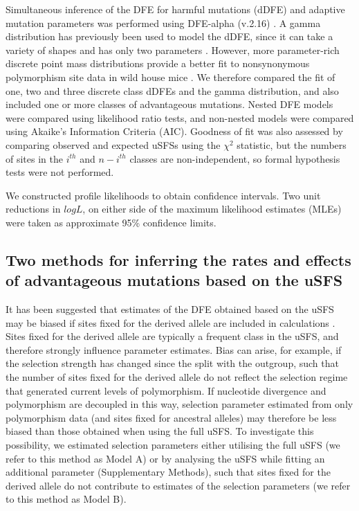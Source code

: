 	Simultaneous inference of the DFE for harmful mutations (dDFE) and adaptive mutation parameters was performed using DFE-alpha (v.2.16) \citep{RN210}. A gamma distribution has previously been used to model the dDFE, since it can take a variety of shapes and has only two parameters \citep{RN109}. However, more parameter-rich discrete point mass distributions provide a better fit to nonsynonymous polymorphism site data in wild house mice \citep{RN178}. We therefore compared the fit of one, two and three discrete class dDFEs and the gamma distribution, and also included one or more classes of advantageous mutations. Nested DFE models were compared using likelihood ratio tests, and non-nested models were compared using Akaike’s Information Criteria (AIC). Goodness of fit was also assessed by comparing observed and expected uSFSs using the $\chi^2$ ­statistic, but the numbers of sites in the $i^{th}$ and $n-i^{th}$ classes are non-independent, so formal hypothesis tests were not performed.

	We constructed profile likelihoods to obtain confidence intervals. Two unit reductions in $logL$, on either side of the maximum likelihood estimates (MLEs) were taken as approximate 95\% confidence limits. 

\subsection{Two methods for inferring the rates and effects of advantageous mutations based on the uSFS}

	It has been suggested that estimates of the DFE obtained based on the uSFS may be biased if sites fixed for the derived allele are included in calculations \cite{RN354}. Sites fixed for the derived allele are typically a frequent class in the uSFS, and therefore strongly influence parameter estimates. Bias can arise, for example, if the selection strength has changed since the split with the outgroup, such that the number of sites fixed for the derived allele do not reflect the selection regime that generated current levels of polymorphism. If nucleotide divergence and polymorphism are decoupled in this way, selection parameter estimated from only polymorphism data (and sites fixed for ancestral alleles) may therefore be less biased than those obtained when using the full uSFS. To investigate this possibility, we estimated selection parameters either utilising the full uSFS (we refer to this method as Model A) or by analysing the uSFS while fitting an additional parameter (Supplementary Methods), such that sites fixed for the derived allele do not contribute to estimates of the selection parameters (we refer to this method as Model B). 

